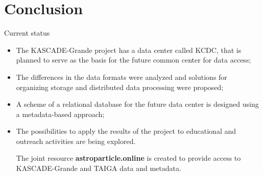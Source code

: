\section{Conclusion}

\begin{frame}{Current status}
  \begin{itemize}
    \item The KASCADE-Grande project has a data center called KCDC, that is planned to serve as the basis for the future common center for data access;
    \item The differences in the data formats were analyzed and solutions for organizing storage and distributed data processing were proposed;
    \item A scheme of a relational database for the future data center is designed using a metadata-based approach;
  \item The possibilities to apply the results of the project to educational and outreach activities are being explored.

    The joint resource \textbf{\textcolor{kit-green100}{astroparticle.online}} is created to provide access to KASCADE-Grande and TAIGA data and metadata.
  \end{itemize}
\end{frame}

